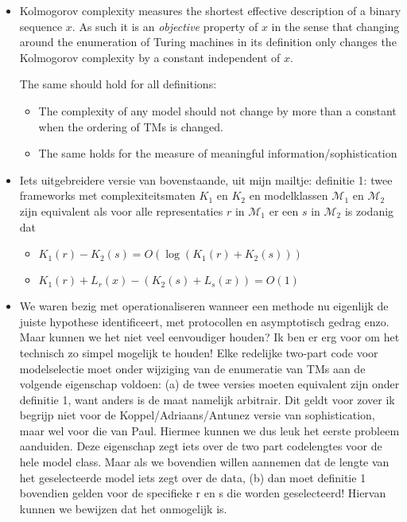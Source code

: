 \documentclass{article}
\newcommand{\M}{\mathcal M}
\begin{document}
\begin{itemize}


\item Kolmogorov complexity measures the shortest effective description of a binary sequence $x$. As such it is an \emph{objective} property of $x$ in the sense that changing around the enumeration of Turing machines in its definition only changes the Kolmogorov complexity by a constant independent of $x$.

The same should hold for all definitions:
\begin{itemize}
\item The complexity of any model should not change by more than a constant when the ordering of TMs is changed.
\item The same holds for the measure of meaningful information/sophistication
\end{itemize}

\item Iets uitgebreidere versie van bovenstaande, uit mijn mailtje: definitie 1: twee frameworks met complexiteitsmaten $K_1$ en $K_2$ en modelklassen $\M_1$ en $\M_2$ zijn equivalent als voor alle representaties $r$ in $\M_1$ er een $s$ in $\M_2$ is zodanig dat 
\begin{itemize}
\item $K_1(r)-K_2(s) = O(\log(K_1(r)+K_2(s)))$
\item $K_1(r)+L_r(x) - (K_2(s)+L_s(x)) = O(1)$
\end{itemize}

\item We waren bezig met operationaliseren wanneer een methode nu eigenlijk de juiste hypothese identificeert, met protocollen en asymptotisch gedrag enzo. Maar kunnen we het niet veel eenvoudiger houden? Ik ben er erg voor om het technisch zo simpel mogelijk te houden! Elke redelijke two-part code voor modelselectie moet onder wijziging van de enumeratie van TMs aan de volgende eigenschap voldoen:
(a) de twee versies moeten equivalent zijn onder definitie 1, want anders is de maat namelijk arbitrair. Dit geldt voor zover ik begrijp niet voor de Koppel/Adriaans/Antunez versie van sophistication, maar wel voor die van Paul. Hiermee kunnen we dus leuk het eerste probleem aanduiden. 
Deze eigenschap zegt iets over de two part codelengtes voor de hele model class. Maar als we bovendien willen aannemen dat de lengte van het geselecteerde model iets zegt over de data,
(b) dan moet definitie 1 bovendien gelden voor de specifieke r en s die worden geselecteerd! Hiervan kunnen we bewijzen dat het onmogelijk is.


\end{itemize}
\end{document}

